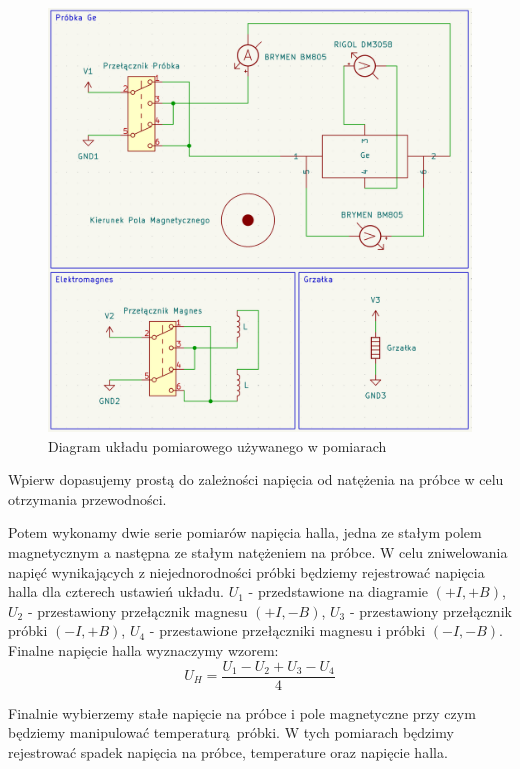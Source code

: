 \documentclass[12pt]{article}
\begin{document}
\begin{figure}[H]
    \centering
    \includegraphics[scale=0.3]{diagram}
    \caption{Diagram układu pomiarowego używanego w pomiarach \cite{diagram}}
    \label{fig:diagram}
\end{figure}

Wpierw dopasujemy prostą do zależności napięcia od natężenia na próbce w celu otrzymania przewodności.

Potem wykonamy dwie serie pomiarów napięcia halla, jedna ze stałym polem magnetycznym a następna ze stałym natężeniem na próbce.
W celu zniwelowania napięć wynikających z niejednorodności próbki będziemy rejestrować napięcia halla dla czterech ustawień układu.
$U_1$ - przedstawione na diagramie $(+I, +B)$, $U_2$ - przestawiony przełącznik magnesu $(+I, -B)$, $U_3$ - przestawiony przełącznik próbki $(-I, +B)$, $U_4$ - przestawione przełączniki magnesu i próbki $(-I, -B)$.
Finalne napięcie halla wyznaczymy wzorem:
\begin{equation}
    U_H = \frac{U_1 - U_2 + U_3 - U_4}{4}
    \label{eq:effective_hall}
\end{equation}

Finalnie wybierzemy stałe napięcie na próbce i pole magnetyczne przy czym będziemy manipulować temperaturą próbki.
W tych pomiarach będzimy rejestrować spadek napięcia na próbce, temperature oraz napięcie halla.
\end{document}
